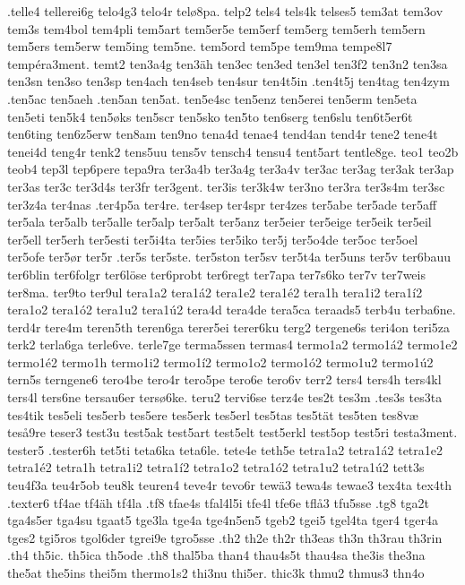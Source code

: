 {{.telle4
tellerei6g
telo4g3
telo4r
telø8pa.
telp2
tels4
tels4k
telses5
tem3at
tem3ov
tem3s
tem4bol
tem4pli
tem5art
tem5er5e
tem5erf
tem5erg
tem5erh
tem5ern
tem5ers
tem5erw
tem5ing
tem5ne.
tem5ord
tem5pe
tem9ma
tempe8l7
tempéra3ment.
temt2
ten3a4g
ten3äh
ten3ec
ten3ed
ten3el
ten3f2
ten3n2
ten3sa
ten3sn
ten3so
ten3sp
ten4ach
ten4seb
ten4sur
ten4t5in
.ten4t5j
ten4tag
ten4zym
.ten5ac
ten5aeh
.ten5an
ten5at.
ten5e4sc
ten5enz
ten5erei
ten5erm
ten5eta
ten5eti
ten5k4
ten5øks
ten5scr
ten5sko
ten5to
ten6serg
ten6slu
ten6t5er6t
ten6ting
ten6z5erw
ten8am
ten9no
tena4d
tenae4
tend4an
tend4r
tene2
tene4t
tenei4d
teng4r
tenk2
tens5uu
tens5v
tensch4
tensu4
tent5art
tentle8ge.
teo1
teo2b
teob4
tep3l
tep6pere
tepa9ra
ter3a4b
ter3a4g
ter3a4v
ter3ac
ter3ag
ter3ak
ter3ap
ter3as
ter3c
ter3d4s
ter3fr
ter3gent.
ter3is
ter3k4w
ter3no
ter3ra
ter3s4m
ter3sc
ter3z4a
ter4nas
.ter4p5a
ter4re.
ter4sep
ter4spr
ter4zes
ter5abe
ter5ade
ter5aff
ter5ala
ter5alb
ter5alle
ter5alp
ter5alt
ter5anz
ter5eier
ter5eige
ter5eik
ter5eil
ter5ell
ter5erh
ter5esti
ter5i4ta
ter5ies
ter5iko
ter5j
ter5o4de
ter5oc
ter5oel
ter5ofe
ter5ør
ter5r
.ter5s
ter5ste.
ter5ston
ter5sv
ter5t4a
ter5uns
ter5v
ter6bauu
ter6blin
ter6folgr
ter6löse
ter6probt
ter6regt
ter7apa
ter7s6ko
ter7v
ter7weis
ter8ma.
ter9to
ter9ul
tera1a2
tera1á2
tera1e2
tera1é2
tera1h
tera1i2
tera1í2
tera1o2
tera1ó2
tera1u2
tera1ú2
tera4d
tera4de
tera5ca
teraads5
terb4u
terba6ne.
terd4r
tere4m
teren5th
teren6ga
terer5ei
terer6ku
terg2
tergene6s
teri4on
teri5za
terk2
terla6ga
terle6ve.
terle7ge
terma5ssen
termas4
termo1a2
termo1á2
termo1e2
termo1é2
termo1h
termo1i2
termo1í2
termo1o2
termo1ó2
termo1u2
termo1ú2
tern5s
terngene6
tero4be
tero4r
tero5pe
tero6e
tero6v
terr2
ters4
ters4h
ters4kl
ters4l
ters6ne
tersau6er
tersø6ke.
teru2
tervi6se
terz4e
tes2t
tes3m
.tes3s
tes3ta
tes4tik
tes5eli
tes5erb
tes5ere
tes5erk
tes5erl
tes5tas
tes5tät
tes5ten
tes8væ
teså9re
teser3
test3u
test5ak
test5art
test5elt
test5erkl
test5op
test5ri
testa3ment.
tester5
.tester6h
tet5ti
teta6ka
teta6le.
tete4e
teth5e
tetra1a2
tetra1á2
tetra1e2
tetra1é2
tetra1h
tetra1i2
tetra1í2
tetra1o2
tetra1ó2
tetra1u2
tetra1ú2
tett3s
teu4f3a
teu4r5ob
teu8k
teuren4
teve4r
tevo6r
tewä3
tewa4s
tewae3
tex4ta
tex4th
.texter6
tf4ae
tf4äh
tf4la
.tf8
tfae4s
tfal4l5i
tfe4l
tfe6e
tflå3
tfu5sse
.tg8
tga2t
tga4s5er
tga4su
tgaat5
tge3la
tge4a
tge4n5en5
tgeb2
tgei5
tgel4ta
tger4
tger4a
tges2
tgi5ros
tgol6der
tgrei9e
tgro5sse
.th2
th2e
th2r
th3eas
th3n
th3rau
th3rin
.th4
th5ic.
th5ica
th5ode
.th8
thal5ba
than4
thau4s5t
thau4sa
the3is
the3na
the5at
the5ins
thei5m
thermo1s2
thi3nu
thi5er.
thic3k
thmu2
thmus3
thn4o
}}
